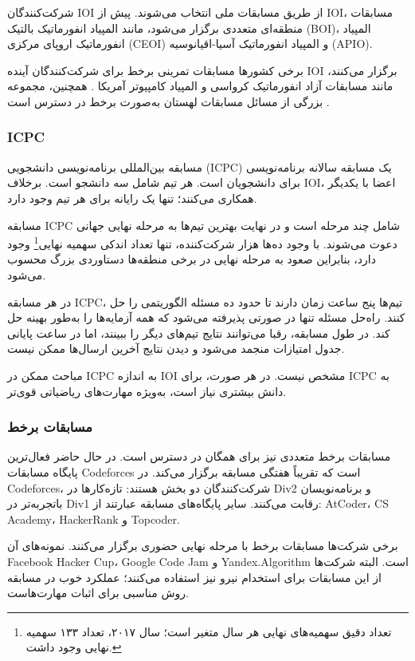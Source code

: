 شرکت‌کنندگان IOI از طریق مسابقات ملی انتخاب می‌شوند.
پیش از IOI، مسابقات منطقه‌ای متعددی برگزار می‌شود،
مانند المپیاد انفورماتیک بالتیک (BOI)،
المپیاد انفورماتیک اروپای مرکزی (CEOI)
و المپیاد انفورماتیک آسیا-اقیانوسیه (APIO).

برخی کشورها مسابقات تمرینی برخط برای شرکت‌کنندگان آینده IOI برگزار می‌کنند،
مانند مسابقات آزاد انفورماتیک کرواسی \cite{coci}
و المپیاد کامپیوتر آمریکا \cite{usaco}.
همچنین، مجموعه بزرگی از مسائل مسابقات لهستان به‌صورت برخط در دسترس است \cite{main}.

\subsubsection{ICPC}

مسابقه بین‌المللی برنامه‌نویسی دانشجویی (ICPC)
یک مسابقه سالانه برنامه‌نویسی برای دانشجویان است.
هر تیم شامل سه دانشجو است.
برخلاف IOI، اعضا با یکدیگر همکاری می‌کنند؛
تنها یک رایانه برای هر تیم وجود دارد.

مسابقه ICPC شامل چند مرحله است و در نهایت بهترین تیم‌ها به مرحله نهایی جهانی دعوت می‌شوند.
با وجود ده‌ها هزار شرکت‌کننده، تنها تعداد اندکی سهمیه نهایی\footnote{تعداد دقیق سهمیه‌های نهایی هر سال متغیر است؛ سال ۲۰۱۷، تعداد ۱۳۳ سهمیه نهایی وجود داشت.} وجود دارد،
بنابراین صعود به مرحله نهایی در برخی منطقه‌ها دستاوردی بزرگ محسوب می‌شود.

در هر مسابقه ICPC، تیم‌ها پنج ساعت زمان دارند تا حدود ده مسئله الگوریتمی را حل کنند.
راه‌حل مسئله تنها در صورتی پذیرفته می‌شود که همه آزمایه‌ها را به‌طور بهینه حل کند.
در طول مسابقه، رقبا می‌توانند نتایج تیم‌های دیگر را ببینند،
اما در ساعت پایانی جدول امتیازات منجمد می‌شود و دیدن نتایج آخرین ارسال‌ها ممکن نیست.

مباحث ممکن در ICPC به اندازه IOI مشخص نیست.
در هر صورت، برای ICPC به دانش بیشتری نیاز است، به‌ویژه مهارت‌های ریاضیاتی قوی‌تر.

\subsubsection{مسابقات برخط}

مسابقات برخط متعددی نیز برای همگان در دسترس است.
در حال حاضر فعال‌ترین پایگاه مسابقات Codeforces است
که تقریباً هفتگی مسابقه برگزار می‌کند.
در Codeforces، شرکت‌کنندگان دو بخش هستند:
تازه‌کارها در Div2 و برنامه‌نویسان با‌تجربه‌تر در Div1 رقابت می‌کنند.
سایر پایگاه‌های مسابقه عبارتند از: AtCoder، CS Academy، HackerRank و Topcoder.

برخی شرکت‌ها مسابقات برخط با مرحله نهایی حضوری برگزار می‌کنند.
نمونه‌های آن Facebook Hacker Cup،
Google Code Jam و Yandex.Algorithm است.
البته شرکت‌ها از این مسابقات برای استخدام نیرو نیز استفاده می‌کنند؛
عملکرد خوب در مسابقه روش مناسبی برای اثبات مهارت‌هاست.

